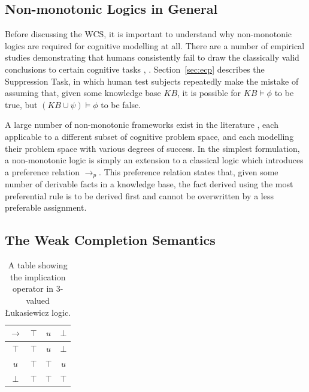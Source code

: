 \documentclass{article}
\begin{document}
\subsection{Non-monotonic Logics in General}

Before discussing the WCS, it is important to understand why non-monotonic logics are required for cognitive modelling at all. There are a number of empirical studies demonstrating that humans consistently fail to draw the classically valid conclusions to certain cognitive tasks \citep{byrne1989suppressing}, \citep{wason1968reasoning}. Section~\ref{sec:ecp} describes the Suppression Task, in which human test subjects repeatedly make the mistake of assuming that, given some knowledge base $KB$, it is possible for $KB \models \phi$ to be true, but $(KB \cup \psi) \models \phi$ to be false.

A large number of non-monotonic frameworks exist in the literature \citep{mcdermott1980non}, each applicable to a different subset of cognitive problem space, and each modelling their problem space with various degrees of success. In the simplest formulation, a non-monotonic logic is simply an extension to a classical logic which introduces a preference relation $\rightarrow_p$. This preference relation states that, given some number of derivable facts in a knowledge base, the fact derived using the most preferential rule is to be derived first and cannot be overwritten by a less preferable assignment.

\subsection{The Weak Completion Semantics}

\begin{table}
\begin{center}


\begin{tabular}{ c | c c c }
  $\rightarrow$& $\top$ & $u$ & $\bot$ \\ \hline
 $\top$ & $\top$ & $u$ & $\bot$ \\  
 $u$ & $\top$ & $\top$ & $u$\\  
 $\bot$ & $\top$ & $\top$ & $\top$
\end{tabular}
\caption{A table showing the implication operator in 3-valued \L ukasiewicz logic.}
\label{tbl:luk}

\end{center}
\end{table}
\end{document}
